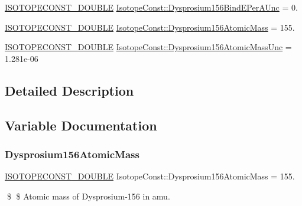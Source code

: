 \begin{DoxyCompactItemize}
\item 
\mbox{\hyperlink{group___isotope_const-_macros_ga8f45a7272ce02c0b4c65c44636ed719a}{I\+S\+O\+T\+O\+P\+E\+C\+O\+N\+S\+T\+\_\+\+D\+O\+U\+B\+LE}} \mbox{\hyperlink{group___isotope_const-_dysprosium-_dy156_gaef58366552b79470fcbd1d245d0356b7}{Isotope\+Const\+::\+Dysprosium156\+Bind\+E\+Per\+A\+Unc}} = 0.
\item 
\mbox{\hyperlink{group___isotope_const-_macros_ga8f45a7272ce02c0b4c65c44636ed719a}{I\+S\+O\+T\+O\+P\+E\+C\+O\+N\+S\+T\+\_\+\+D\+O\+U\+B\+LE}} \mbox{\hyperlink{group___isotope_const-_dysprosium-_dy156_gac6f094622f6e4f4cb1443c834c70c3a4}{Isotope\+Const\+::\+Dysprosium156\+Atomic\+Mass}} = 155.
\item 
\mbox{\hyperlink{group___isotope_const-_macros_ga8f45a7272ce02c0b4c65c44636ed719a}{I\+S\+O\+T\+O\+P\+E\+C\+O\+N\+S\+T\+\_\+\+D\+O\+U\+B\+LE}} \mbox{\hyperlink{group___isotope_const-_dysprosium-_dy156_ga16bf82a8149cee326a2a845671d45ca6}{Isotope\+Const\+::\+Dysprosium156\+Atomic\+Mass\+Unc}} = 1.\+281e-\/06
\end{DoxyCompactItemize}


\subsection{Detailed Description}


\subsection{Variable Documentation}
\mbox{\label{group___isotope_const-_dysprosium-_dy156_gac6f094622f6e4f4cb1443c834c70c3a4}} 
\subsubsection{\texorpdfstring{Dysprosium156\+Atomic\+Mass}{Dysprosium156AtomicMass}}
{\footnotesize\ttfamily \mbox{\hyperlink{group___isotope_const-_macros_ga8f45a7272ce02c0b4c65c44636ed719a}{I\+S\+O\+T\+O\+P\+E\+C\+O\+N\+S\+T\+\_\+\+D\+O\+U\+B\+LE}} Isotope\+Const\+::\+Dysprosium156\+Atomic\+Mass = 155.}

\$ \$ Atomic mass of Dysprosium-\/156 in amu. \mbox{\label{group___isotope_const-_dysprosium-_dy156_ga16bf82a8149cee326a2a845671d45ca6}} 
